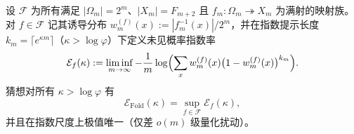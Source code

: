 \begin{conjecture}\label{conj:pom-icl-efficiency-extremal-under-fibonacci-rate}
设 \(\mathcal F\) 为所有满足 \(|\Omega_m|=2^m\)、\(|X_m|=F_{m+2}\) 且 \(f_m:\Omega_m\twoheadrightarrow X_m\) 为满射的映射族。
对 \(f\in\mathcal F\) 记其诱导分布 \(w_m^{(f)}(x):=|f_m^{-1}(x)|/2^m\)，并在指数提示长度 \(k_m=\lceil e^{\kappa m}\rceil\)（\(\kappa>\log\varphi\)）下定义未见概率指数率
\[
\mathcal E_f(\kappa):=\liminf_{m\to\infty}-\frac1m\log\Bigl(\sum_{x}w_m^{(f)}(x)\bigl(1-w_m^{(f)}(x)\bigr)^{k_m}\Bigr).
\]
猜想对所有 \(\kappa>\log\varphi\) 有
\[
\mathcal E_{\mathrm{Fold}}(\kappa)=\sup_{f\in\mathcal F}\mathcal E_f(\kappa),
\]
并且在指数尺度上极值唯一（仅差 \(o(m)\) 级量化扰动）。
\end{conjecture}

\endinput
